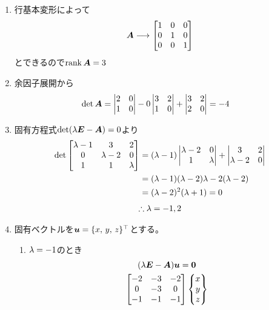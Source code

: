\begin{ans*}
  ${}$
  \begin{enumerate}[label=(\arabic*)]
    \item 行基本変形によって
    \begin{gather}
      \bm{A} \longrightarrow
      \begin{bmatrix}
        1& 0& 0 \\
        0& 1& 0 \\
        0& 0& 1
      \end{bmatrix}
    \end{gather}
    とできるので$\operatorname{rank} \bm{A} = 3$
    \item 余因子展開から
    \begin{align}
      \det \bm{A}
      &=
      \begin{vmatrix}
        2& 0 \\
        1& 0
      \end{vmatrix}
      - 0
      \begin{vmatrix}
        3& 2 \\
        1& 0
      \end{vmatrix}
      +
      \begin{vmatrix}
        3& 2 \\
        2& 0
      \end{vmatrix}
      = -4
    \end{align}
    \item 固有方程式$\det({\lambda}\bm{E} - \bm{A}) = 0$より
    \begin{align}
      \det
      \begin{bmatrix}
        {\lambda}-1& 3& 2 \\
        0& {\lambda}-2& 0 \\
        1& 1& {\lambda}
      \end{bmatrix}
      &= ({\lambda} -1)
      \begin{vmatrix}
        {\lambda}-2 & 0 \\
        1& {\lambda}
      \end{vmatrix}
      +
      \begin{vmatrix}
        3& 2 \\
        {\lambda}-2& 0
      \end{vmatrix} \\
      &= ({\lambda}-1)({\lambda}-2){\lambda} - 2({\lambda}-2) \\
      &= ({\lambda}-2)^2({\lambda}+1) = 0
    \end{align}
    \begin{gather}
      \therefore {\lambda} = -1, 2
    \end{gather}
    \item 固有ベクトルを${\bm{u}} = \{x,\,y,\,z\}^\top$とする。
    \begin{enumerate}[label=(\roman*)]
      \item ${\lambda} = -1$のとき
      \begin{gather}
        ({\lambda}\bm{E} - \bm{A}){\bm{u}} = \bm{0} \\
        \begin{bmatrix}
          -2& -3& -2 \\
          0& -3& 0 \\
          -1& -1& -1 \\
        \end{bmatrix}
        \begin{Bmatrix}
          x \\ y \\ z
\end{Bmatrix}
\end{gather}
\end{enumerate}
\end{enumerate}
\end{ans*}
